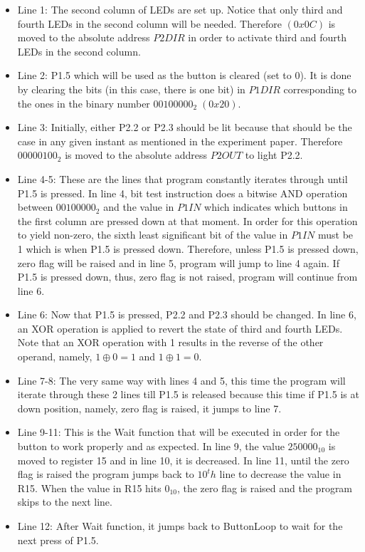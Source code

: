 \documentclass[pdftex,12pt,a4paper]{article}
\begin{document}
\begin{itemize}
    \item Line 1: The second column of LEDs are set up. Notice that only third and fourth LEDs in the second column will be needed. Therefore $(0x0C)$ is moved to the absolute address $P2DIR$ in order to activate third and fourth LEDs in the second column.

\item Line 2: P1.5 which will be used as the button is cleared (set to $0$). It is done by clearing the bits (in this case, there is one bit) in $P1DIR$ corresponding to the ones in the binary number $00100000_2\;(0x20)$.

\item Line 3: Initially, either P2.2 or P2.3 should be lit because that should be the case in any given instant as mentioned in the experiment paper. Therefore $00000100_2$ is moved to the absolute address $P2OUT$ to light P2.2.

\item Line 4-5: These are the lines that program constantly iterates through until P1.5 is pressed. In line 4, bit test instruction does a bitwise AND operation between $00100000_2$ and the value in $P1IN$ which indicates which buttons in the first column are pressed down at that moment. In order for this operation to yield non-zero, the sixth least significant bit of the value in $P1IN$ must be 1 which is when P1.5 is pressed down. Therefore, unless P1.5 is pressed down, zero flag will be raised and in line 5, program will jump to line 4 again. If P1.5 is pressed down, thus, zero flag is not raised, program will continue from line 6.

\item Line 6: Now that P1.5 is pressed, P2.2 and P2.3 should be changed. In line 6, an XOR operation is applied to revert the state of third and fourth LEDs. Note that an XOR operation with 1 results in the reverse of the other operand, namely, $1 \oplus 0 = 1$ and $1 \oplus 1 = 0$.

\item Line 7-8: The very same way with lines 4 and 5, this time the program will iterate through these 2 lines till P1.5 is released because this time if P1.5 is at down position, namely, zero flag is raised, it jumps to line 7.

\item Line 9-11: This is the Wait function that will be executed in order for the button to work properly and as expected. In line 9, the value $250000_{10}$ is moved to register 15 and in line 10, it is decreased. In line 11, until the zero flag is raised the program jumps back to $10^th$ line to decrease the value in R15. When the value in R15 hits $0_{10}$, the zero flag is raised and the program skips to the next line.

\item Line 12: After Wait function, it jumps back to ButtonLoop to wait for the next press of P1.5.
\end{itemize}
\end{document}
